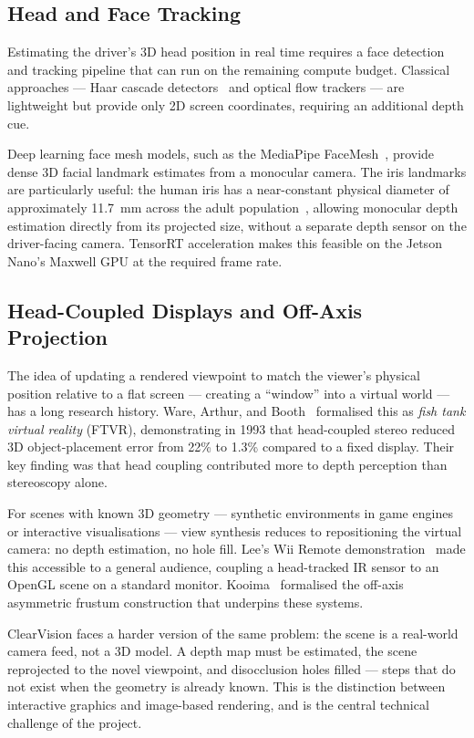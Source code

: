 \documentclass[11pt, a4paper]{report}
\begin{document}
\subsection{Head and Face Tracking}

Estimating the driver's 3D head position in real time requires a face
detection and tracking pipeline that can run on the remaining compute budget.
Classical approaches --- Haar cascade detectors~\cite{viola2004robust}
and optical flow trackers --- are lightweight but provide only 2D screen
coordinates, requiring an additional depth cue.

Deep learning face mesh models, such as the MediaPipe
FaceMesh~\cite{kartynnik2019facemesh}, provide dense 3D facial landmark
estimates from a monocular camera.
The iris landmarks are particularly useful: the human iris has a
near-constant physical diameter of approximately 11.7~mm across the adult
population~\cite{bergmanson2017iris}, allowing monocular depth estimation
directly from its projected size, without a separate depth sensor on the
driver-facing camera.
TensorRT acceleration makes this feasible on the Jetson Nano's Maxwell GPU
at the required frame rate.

\subsection{Head-Coupled Displays and Off-Axis Projection}

The idea of updating a rendered viewpoint to match the viewer's physical
position relative to a flat screen --- creating a ``window'' into a
virtual world --- has a long research history.
Ware, Arthur, and Booth~\cite{ware1993fishtank} formalised this as
\emph{fish tank virtual reality} (FTVR), demonstrating in 1993 that
head-coupled stereo reduced 3D object-placement error from 22\% to 1.3\%
compared to a fixed display.
Their key finding was that head coupling contributed more to depth
perception than stereoscopy alone.

For scenes with known 3D geometry --- synthetic environments in game
engines or interactive visualisations --- view synthesis reduces to
repositioning the virtual camera: no depth estimation, no hole fill.
Lee's Wii Remote demonstration~\cite{lee2008head} made this accessible
to a general audience, coupling a head-tracked IR sensor to an OpenGL
scene on a standard monitor.
Kooima~\cite{kooima2009generalized} formalised the off-axis asymmetric
frustum construction that underpins these systems.

ClearVision faces a harder version of the same problem: the scene is a
real-world camera feed, not a 3D model.
A depth map must be estimated, the scene reprojected to the novel
viewpoint, and disocclusion holes filled --- steps that do not exist
when the geometry is already known.
This is the distinction between interactive graphics and image-based
rendering, and is the central technical challenge of the project.
\end{document}
